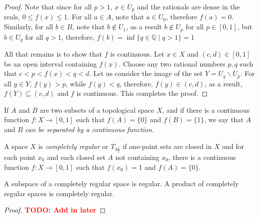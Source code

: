 \begin{proof}
    Note that since for all $p > 1$, $x\in U_p$ and the rationals are dense in the reals, $0\le f(x)\le 1$. For all $a\in A$, note that $a\in U_0$, therefore $f(a) = 0$. Similarly, for all $b\in B$, note that $b\notin U_1$, as a result $b\notin U_p$ for all $p\in[0,1]$, but $b\in U_q$ for all $q > 1$, therefore, $f(b) = \inf\{q\in\mathbb{Q}\mid q > 1\} = 1$

    All that remains is to show that $f$ is continuous. Let $x\in X$ and $(c,d)\in[0,1]$ be an open interval containing $f(x)$. Choose any two rational numbers $p,q$ such that $c < p < f(x) < q < d$. Let us consider the image of the set $Y = U_q\backslash\overline{U}_p$. For all $y\in Y$, $f(y) > p$, while $f(y) < q$, therefore, $f(y)\in(c,d)$, as a result, $f(Y)\subseteq (c,d)$ and $f$ is continuous. This completes the proof.
\end{proof}

\begin{definition}
    If $A$ and $B$ are two subsets of a topological space $X$, and if there is a continuous function $f:X\to[0,1]$ such that $f(A) = \{0\}$ and $f(B) = \{1\}$, we say that $A$ and $B$ \textit{can be separated by a continuous function}.
\end{definition}

\begin{definition}
    A space $X$ is \textit{completely regular} or $T_{3\frac{1}{2}}$ if one-point sets are closed in $X$ and for each point $x_0$ and each closed set $A$ not containing $x_0$, there is a continuous function $f:X\to[0,1]$ such that $f(x_0) = 1$ and $f(A) = \{0\}$.
\end{definition}

\begin{theorem}
    A subspace of a completely regular space is regular. A product of completely regular spaces is completely regular.
\end{theorem}
\begin{proof}
    \textbf{\textcolor{red}{TODO: Add in later}}
\end{proof}

